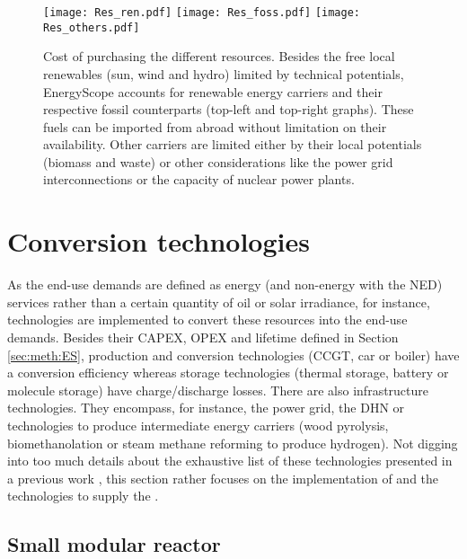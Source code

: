 \begin{figure}[htbp!]
\centering

\texttt{[image: Res\_ren.pdf]}
\texttt{[image: Res\_foss.pdf]}
\texttt{[image: Res\_others.pdf]}
\caption{Cost of purchasing the different resources. Besides the free local renewables (\ie sun, wind and hydro) limited by technical potentials, EnergyScope accounts for renewable energy carriers and their respective fossil counterparts (top-left and top-right graphs). These fuels can be imported from abroad without limitation on their availability. Other carriers are limited either by their local potentials (\ie biomass and waste) or other considerations like the power grid interconnections or the capacity of nuclear power plants.}
\label{fig:cs_resources_cost}
\end{figure}


\section{Conversion technologies}
\label{sec:cs:technologies}
As the end-use demands are defined as energy (and non-energy with the \gls{NED}) services rather than a certain quantity of oil or solar irradiance, for instance, technologies are implemented to convert these resources into the end-use demands. Besides their CAPEX, OPEX and lifetime defined in Section \ref{sec:meth:ES}, production and conversion technologies (\ie \gls{CCGT}, car or boiler) have a conversion efficiency whereas storage technologies (\ie thermal storage, battery or molecule storage) have charge/discharge losses. There are also infrastructure technologies. They encompass, for instance, the power grid, the \gls{DHN} or technologies to produce intermediate energy carriers (\eg wood pyrolysis, biomethanolation or steam methane reforming to produce hydrogen). Not digging into too much details about the exhaustive list of these technologies presented in a previous work \cite{limpens2021generating}, this section rather focuses on the implementation of  and the technologies to supply the .

\subsection{Small modular reactor}
\label{subsec:cs:SMR_tech}

